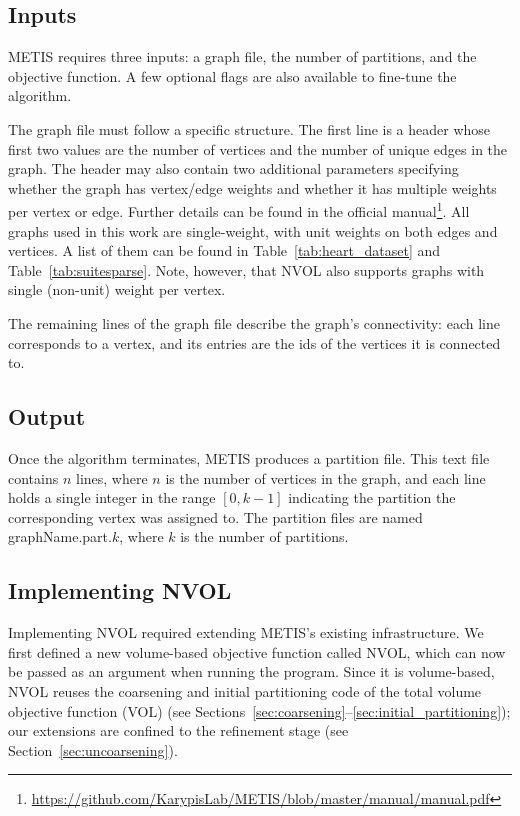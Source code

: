 \subsection{Inputs}
METIS requires three inputs: a graph file, the number of partitions, and the objective function. A few optional flags are also available to fine-tune the algorithm.

The graph file must follow a specific structure. The first line is a header whose first two values are the number of vertices and the number of unique edges in the graph. The header may also contain two additional parameters specifying whether the graph has vertex/edge weights and whether it has multiple weights per vertex or edge. Further details can be found in the official manual\footnote{\url{https://github.com/KarypisLab/METIS/blob/master/manual/manual.pdf}}. All graphs used in this work are single-weight, with unit weights on both edges and vertices. A list of them can be found in Table~\ref{tab:heart_dataset} and Table~\ref{tab:suitesparse}. Note, however, that NVOL also supports graphs with single (non-unit) weight per vertex.

The remaining lines of the graph file describe the graph's connectivity: each line corresponds to a vertex, and its entries are the ids of the vertices it is connected to.

\subsection{Output}
Once the algorithm terminates, METIS produces a partition file. This text file contains $n$ lines, where $n$ is the number of vertices in the graph, and each line holds a single integer in the range $[0, k-1]$ indicating the partition the corresponding vertex was assigned to. The partition files are named graphName.part.$k$, where $k$ is the number of partitions. 

\subsection{Implementing NVOL} \label{sec: implementing NVOL}
Implementing NVOL required extending METIS's existing infrastructure. We first defined a new volume-based objective function called NVOL, which can now be passed as an argument when running the program. Since it is volume-based, NVOL reuses the coarsening and initial partitioning code of the total volume objective function (VOL) (see Sections~\ref{sec:coarsening}--\ref{sec:initial_partitioning}); our extensions are confined to the refinement stage (see Section~\ref{sec:uncoarsening}).

